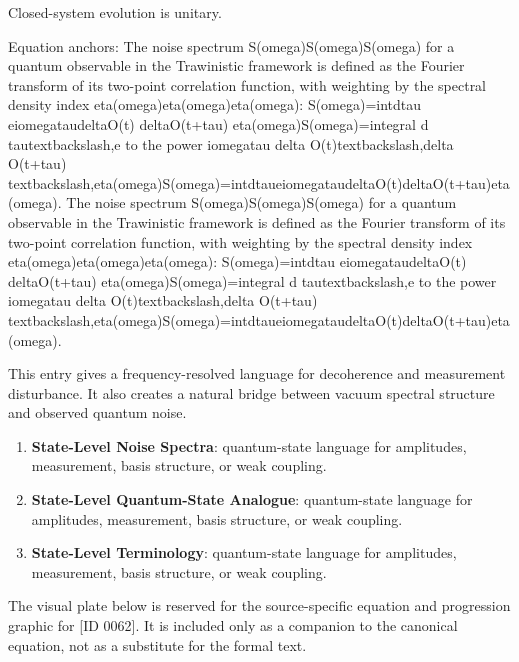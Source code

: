 Closed-system evolution is unitary.

Equation anchors: The noise spectrum S(omega)S(omega)S(omega) for a quantum observable in the Trawinistic framework is defined as the Fourier transform of its two-point correlation function, with weighting by the spectral density index eta(omega)eta(omega)eta(omega): S(omega)=intdtau eiomegataudeltaO(t) deltaO(t+tau) eta(omega)S(omega)=integral d tautextbackslash,e to the power iomegatau delta O(t)textbackslash,delta O(t+tau) textbackslash,eta(omega)S(omega)=intdtaueiomegataudeltaO(t)deltaO(t+tau)eta(omega). The noise spectrum S(omega)S(omega)S(omega) for a quantum observable in the Trawinistic framework is defined as the Fourier transform of its two-point correlation function, with weighting by the spectral density index eta(omega)eta(omega)eta(omega): S(omega)=intdtau eiomegataudeltaO(t) deltaO(t+tau) eta(omega)S(omega)=integral d tautextbackslash,e to the power iomegatau delta O(t)textbackslash,delta O(t+tau) textbackslash,eta(omega)S(omega)=intdtaueiomegataudeltaO(t)deltaO(t+tau)eta(omega).

This entry gives a frequency-resolved language for decoherence and measurement disturbance. It also creates a natural bridge between vacuum spectral structure and observed quantum noise.
\endgroup

\begingroup\footnotesize\sloppy
\begin{enumerate}[leftmargin=1.35em,itemsep=1pt,topsep=1pt,parsep=0pt]
\item \textbf{State-Level Noise Spectra}: quantum-state language for amplitudes, measurement, basis structure, or weak coupling.
\item \textbf{State-Level Quantum-State Analogue}: quantum-state language for amplitudes, measurement, basis structure, or weak coupling.
\item \textbf{State-Level Terminology}: quantum-state language for amplitudes, measurement, basis structure, or weak coupling.
\end{enumerate}
\endgroup

\begingroup\footnotesize\sloppy
The visual plate below is reserved for the source-specific equation and progression graphic for [ID 0062]. It is included only as a companion to the canonical equation, not as a substitute for the formal text.
\par\endgroup
\ifTZPDarkEdition
{}
\fi

